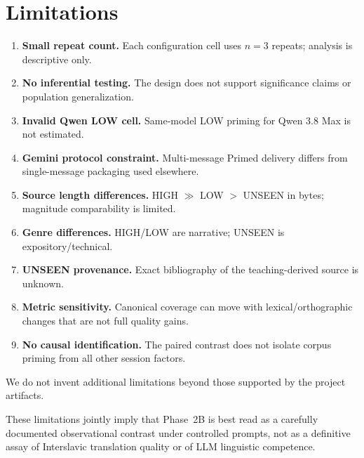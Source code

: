\section{Limitations}
\label{sec:limits}

\begin{enumerate}[leftmargin=*]
  \item \textbf{Small repeat count.} Each configuration cell uses $n{=}3$ repeats; analysis is descriptive only.
  \item \textbf{No inferential testing.} The design does not support significance claims or population generalization.
  \item \textbf{Invalid Qwen LOW cell.} Same-model LOW priming for Qwen 3.8 Max is not estimated.
  \item \textbf{Gemini protocol constraint.} Multi-message Primed delivery differs from single-message packaging used elsewhere.
  \item \textbf{Source length differences.} HIGH $\gg$ LOW $>$ UNSEEN in bytes; magnitude comparability is limited.
  \item \textbf{Genre differences.} HIGH/LOW are narrative; UNSEEN is expository/technical.
  \item \textbf{UNSEEN provenance.} Exact bibliography of the teaching-derived source is unknown.
  \item \textbf{Metric sensitivity.} Canonical coverage can move with lexical/orthographic changes that are not full quality gains.
  \item \textbf{No causal identification.} The paired contrast does not isolate corpus priming from all other session factors.
\end{enumerate}
We do not invent additional limitations beyond those supported by the project artifacts.


These limitations jointly imply that Phase~2B is best read as a carefully documented observational contrast under controlled prompts, not as a definitive assay of Interslavic translation quality or of LLM linguistic competence.
